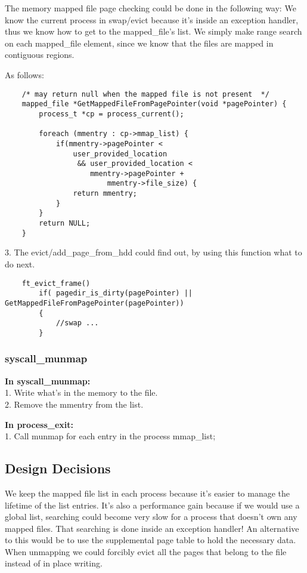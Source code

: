 The memory mapped file page checking could be done in the following way: We know the current process in swap/evict because it's inside an exception handler, thus we know how to get to the mapped\_file's list. We simply make range search on each mapped\_file element, since we know that the files are mapped in contiguous regions.

As follows:
\begin{lstlisting}	
	/* may return null when the mapped file is not present  */
	mapped_file *GetMappedFileFromPagePointer(void *pagePointer) {
		process_t *cp = process_current();
		
		foreach (mmentry : cp->mmap_list) {
			if(mmentry->pagePointer < 
				user_provided_location 
				 && user_provided_location < 
					mmentry->pagePointer + 
						mmentry->file_size) {
				return mmentry;
			}
		}
		return NULL;
	}
\end{lstlisting}
	3. The evict/add\_page\_from\_hdd could find out, by using this function what to do next.
\begin{lstlisting}
	ft_evict_frame()
		if( pagedir_is_dirty(pagePointer) || GetMappedFileFromPagePointer(pagePointer))
		{
			//swap ...
		}
\end{lstlisting}

\subsubsection{ syscall\_munmap }
\textbf{In syscall\_munmap:}
	\\1. Write what's in the memory to the file. 
	\\2. Remove the mmentry from the list.

	 \textbf{In process\_exit:}
	\\1. Call munmap for each entry in the process mmap\_list;


\subsection{Design Decisions}
We keep the mapped file list in each process because it's easier to manage the lifetime of the list entries. It's also a performance gain because if we would use a global list, searching could become very slow for a process that doesn't own any mapped files. That searching is done inside an exception handler! An alternative to this would be to use the supplemental page table to hold the necessary data.
\\When unmapping we could forcibly evict all the pages that belong to the file instead of in place writing.
